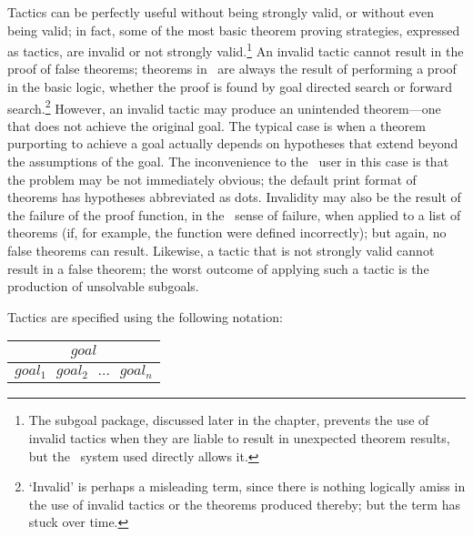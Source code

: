 Tactics can be perfectly useful without being 
strongly valid, or without
even being valid;
in fact, some of the most basic theorem proving strategies, expressed
as tactics, are invalid or not strongly valid.\footnote{The subgoal
package, discussed later in the chapter, prevents the use of
invalid tactics when they are liable to result in unexpected
theorem results, but the \HOL\ system used directly allows 
it.} An invalid tactic
cannot result in the proof of false theorems;
theorems in \HOL\
are always the result of performing a proof in the basic logic,
whether the proof is found by goal directed search
or forward search.\footnote{`Invalid' is perhaps a misleading term, since
there is nothing logically amiss in the use of invalid tactics
or the theorems produced thereby; but the term has stuck over time.} However, an
invalid tactic may produce an unintended theorem---one that does not
achieve the original goal. The typical case is when a theorem
purporting to achieve a goal
actually depends on hypotheses that extend beyond the assumptions of
the goal.  The inconvenience to the \HOL\ user in this case
is that the problem may be not immediately 
obvious; the default print format of theorems has
hypotheses abbreviated as dots. Invalidity may also be the result of the
failure
 of the proof function, in the \ML\ sense of failure, when
applied to a list of theorems (if, for example, the function were
defined incorrectly); but again, no false theorems can result.
Likewise, a tactic that is not strongly valid cannot result in a false
theorem; the worst outcome of applying such a tactic is the production
of unsolvable subgoals.


Tactics are specified using the following notation:

\begin{center}
\begin{tabular}{c} \\
$goal$ \\ \hline \hline
$goal_1\ \ \ goal_2 \ \ \ \ldots\ \ \ goal_n$ \\
\end{tabular}
\end{center}

